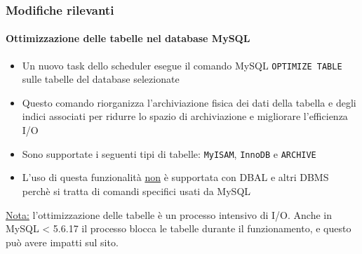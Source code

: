 \begin{frame}[fragile]
	\frametitle{Modifiche rilevanti}
	\framesubtitle{Ottimizzazione delle tabelle nel database MySQL}

	\begin{itemize}

		\item Un nuovo task dello scheduler esegue il comando MySQL \texttt{OPTIMIZE TABLE}
			sulle tabelle del database selezionate

		\item Questo comando riorganizza l'archiviazione fisica dei dati della tabella e degli
			indici associati per ridurre lo spazio di archiviazione e migliorare l'efficienza I/O

		\item Sono supportate i seguenti tipi di tabelle:\newline
			\texttt{MyISAM}, \texttt{InnoDB} e \texttt{ARCHIVE}

		\item L'uso di questa funzionalità \underline{non} è supportata con DBAL e altri DBMS
			perchè si tratta di comandi specifici usati da MySQL

	\end{itemize}


	\begingroup
		\color{red}
			\small
				\underline{Nota:} l'ottimizzazione delle tabelle è un processo intensivo di I/O.
				Anche in MySQL < 5.6.17 il processo blocca le tabelle durante il funzionamento,
				e questo può avere impatti sul sito.
			\normalsize
	\endgroup

\end{frame}



